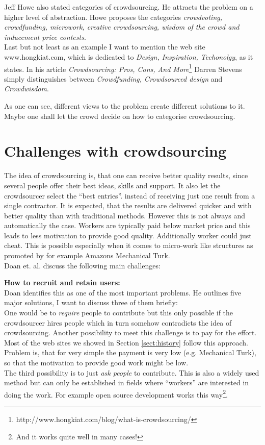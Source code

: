 \documentclass{acm_proc_article-sp}
\begin{document}
Jeff Howe also stated categories of crowdsourcing. He attracts the problem on a higher level of abstraction. Howe proposes the categories \textit{crowdvoting, crowdfunding, microwork, creative crowdsourcing, wisdom of the crowd and inducement price contests}.\\
Last but not least as an example I want to mention the web site www.hongkiat.com, which is dedicated to \textit{Design, Inspiration, Techonolgy}, as it states. In his article \textit{Crowdsourcing: Pros, Cons, And More}\footnote{http://www.hongkiat.com/blog/what-is-crowdsourcing/} Darren Stevens simply distinguishes between \textit{Crowdfunding, Crowdsourced design} and \textit{Crowdwisdom}.

As one can see, different views to the problem create different solutions to it. Maybe one shall let the crowd decide on how to categorise crowdsourcing.

\section{Challenges with crowdsourcing}
\label{sect:problems}
The idea of crowdsourcing is, that one can receive better quality results, since several people offer their best ideas, skills and support. It also let the crowdsourcer select the ``best entries''. instead of receiving just one result from a single contractor. It is expected, that the results are delivered quicker and with better quality than with traditional methods. However this is not always and automatically the case. Workers are typically paid below market price and this leads to less motivation to provide good quality. Additionally worker could just cheat. This is possible especially when it comes to micro-work like structures as promoted by for example Amazons Mechanical Turk.\\
Doan et. al. discuss the following main challenges\cite{doan:crowd}:

\textbf{How to recruit and retain users: }\\
Doan identifies this as one of the most important problems. He outlines five major solutions, I want to discuss three of them briefly:\\
One would be to \textit{require} people to contribute but this only possible if the crowdsourcer hires people which in turn somehow contradicts the idea of crowdsourcing. Another possibility to meet this challenge is to pay for the effort. Most of the web sites we showed in Section \ref{sect:history} follow this approach. Problem is, that for very simple the payment is very low (e.g. Mechanical Turk), so that the motivation to provide good work might be low.\\
The third possibility is to just \textit{ask people} to contribute. This is also a widely used method but can only be established in fields where ``workers'' are interested in doing the work. For example open source development works this way\footnote{And it works quite well in many cases!}.
\end{document}
